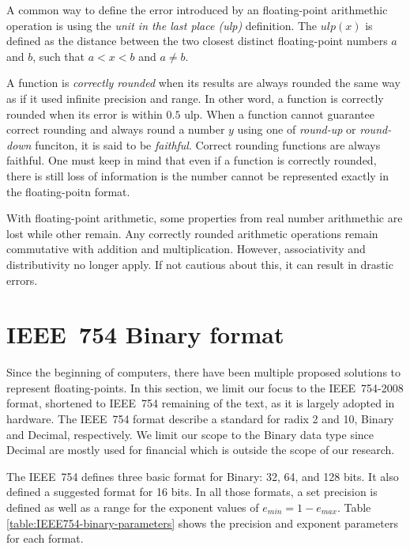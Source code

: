 A common way to define the error introduced by an floating-point arithmethic
operation is using the \textit{unit in the last place (ulp)} definition.
The $ulp(x)$ is defined as the distance between the two closest distinct
floating-point numbers $a$ and $b$, such that $a < x < b$ and $a \neq b$.

A function is \textit{correctly rounded} when its results are always rounded the 
same way as if it used infinite precision and range.
In other word, a function is correctly rounded when its error is within $0.5$ ulp.
When a function cannot guarantee correct rounding and always round a number $y$
using one of \textit{round-up} or \textit{round-down} funciton, it is said to be \textit{faithful}.
Correct rounding functions are always faithful.
One must keep in mind that even if a function is correctly rounded, there is
still loss of information is the number cannot be represented exactly in the
floating-poitn format.

With floating-point arithmetic, some properties from real number arithmethic are lost while other remain.
Any correctly rounded arithmetic operations remain commutative with addition and multiplication.
However, associativity and distributivity no longer apply.
If not cautious about this, it can result in drastic errors.


\section{IEEE~754 Binary format}
Since the beginning of computers, there have been multiple proposed solutions to represent floating-points.
In this section, we limit our focus to the IEEE~754-2008 format, shortened to IEEE~754 remaining of the text, as it is largely adopted in hardware.
The IEEE~754 format describe a standard for radix 2 and 10, Binary and Decimal, respectively.
We limit our scope to the Binary data type since Decimal are mostly used for financial which is outside the scope of our research.

The IEEE~754 defines three basic format for Binary: 32, 64, and 128 bits.
It also defined a suggested format for 16 bits.
In all those formats, a set precision is defined as well as a range for the exponent values of $e_{min} = 1 - e_{max}$.
Table \ref{table:IEEE754-binary-parameters} shows the precision and exponent parameters for each format. 

